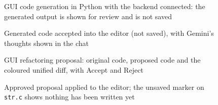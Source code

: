 \documentclass[12pt,a4paper,oneside]{book}
\begin{document}
\begin{figure}[htbp]
\centering
{}
\caption{GUI code generation in Python with the backend connected: the generated output is shown for review and is not saved}
\label{fig:ca-gui-generate}
\end{figure}

\begin{figure}[htbp]
\centering
{}
\caption{Generated code accepted into the editor (not saved), with Gemini's thoughts shown in the chat}
\label{fig:ca-gui-generate-accepted}
\end{figure}

\begin{figure}[htbp]
\centering
{}
\caption{GUI refactoring proposal: original code, proposed code and the coloured unified diff, with Accept and Reject}
\label{fig:ca-gui-proposal}
\end{figure}

\begin{figure}[htbp]
\centering
{}
\caption{Approved proposal applied to the editor; the unsaved marker on \texttt{str.c} shows nothing has been written yet}
\label{fig:ca-gui-accepted}
\end{figure}

\clearpage
\end{document}
